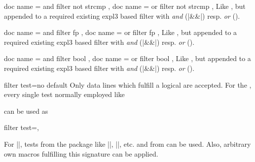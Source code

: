 \documentclass[a4paper,11pt]{ltxdoc}
\begin{document}
\begin{docCsvKeys}[
    doc parameter   = {=\marg{stringA}\marg{stringB}},
    doc description = {no default},
    doc new = {2022-10-21}
  ]
  {
    { doc name = and filter not strcmp  },
    { doc name = or filter not strcmp },
  }
  Like , but appended to a required existing
  expl3 based filter with \emph{and} (|&&|) resp. \emph{or} (\texttt{\textbar\textbar}).
\end{docCsvKeys}


\begin{docCsvKeys}[
    doc parameter   = {=\marg{floating point expression}},
    doc description = {style,no default},
    doc new = {2022-10-21}
  ]
  {
    { doc name = and filter fp  },
    { doc name = or filter fp },
  }
  Like , but appended to a required existing
  expl3 based filter with \emph{and} (|&&|) resp. \emph{or} (\texttt{\textbar\textbar}).
\end{docCsvKeys}


\begin{docCsvKeys}[
    doc parameter   = {=\marg{boolean expression}},
    doc description = {style,no default},
    doc new = {2022-10-21}
  ]
  {
    { doc name = and filter bool },
    { doc name = or filter bool },
  }
  Like , but appended to a required existing
  expl3 based filter with \emph{and} (|&&|) resp. \emph{or} (\texttt{\textbar\textbar}).
\end{docCsvKeys}


\clearpage

\begin{docCsvKey}[][doc new=2016-07-01]{filter test}{=}{no default}
  Only data lines which fulfill a logical  are accepted.
  For the , every single test normally employed like
\begin{dispListing}
\end{dispListing}
  can be used as
\begin{dispListing}
filter test=,
\end{dispListing}
  For |\iftest|, tests from the  package like
  |\ifnumcomp|, |\ifdimgreater|, etc. and from  can be used.
  Also, arbitrary own macros fulfilling this signature can be applied.
\begin{dispExample}
\end{dispExample}
\end{docCsvKey}
\end{document}

